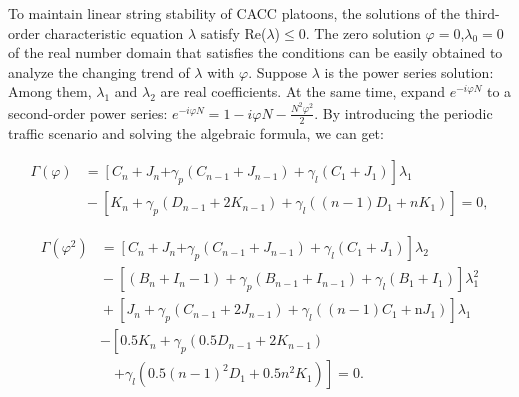 \documentclass[journal]{IEEEtran}
\begin{document}
To maintain linear string stability of CACC platoons, the solutions of the third-order characteristic equation $\lambda$ satisfy Re($\lambda$)$\leq$0. The zero solution $\varphi=0$,$\lambda_0=0$ of the real number domain that satisfies the conditions can be easily obtained to analyze the changing trend of $\lambda$ with $\varphi$. Suppose $\lambda$ is the power series solution: Among them, $\lambda_1$ and $\lambda_2$ are real coefficients. At the same time, expand $e^{-i \varphi N}$ to a second-order power series: $e^{-i \varphi N}=1-i \varphi N-\frac{N^{2} \varphi^{2}}{2}$. By introducing the periodic traffic scenario and solving the algebraic formula, we can get:
\begin{small}
  \begin{equation}
    \begin{aligned}
      \Gamma(\varphi) & =\left[C_{n}+J_{n}\right.\left.+\gamma_{p}\left(C_{n-1}+J_{n-1}\right)+\gamma_{l}\left(C_{1}+J_{1}\right)\right] \lambda_{1}       \\
                      & \!-\!\left[K_{n}\!+\!\gamma_{p}\left(D_{n-1}\!+\!2 K_{n-1}\right)\!+\!\gamma_{l}\left((n-1) D_{1}\!+\!n K_{1}\right)\right]\!=\!0,
    \end{aligned}
    \label{Eq15}
  \end{equation}
\end{small}
\begin{small}
  \begin{equation}
    \begin{aligned}
      \Gamma\left(\varphi^{2}\right) & =\left[C_{n}+J_{n}\right.\left.+\gamma_{p}\left(C_{n-1}+J_{n-1}\right)+\gamma_{l}\left(C_{1}+J_{1}\right)\right] \lambda_{2}                               \\
                                     & \!-\!\left[\left(B_{n}\!+\!I_{n}-1\right)\!+\!\gamma_{p}\left(B_{n-1}\!+\!I_{n-1}\right)\!+\!\gamma_{l}\left(B_{1}\!+\!I_{1}\right)\right] \lambda_{1}^{2} \\
                                     & \!+\!\left[J_{n}\!+\!\gamma_{p}\left(C_{n-1}\!+\!2 J_{n-1}\right)\!+\!\gamma_{l}\left((n-1) C_{1}\!+\!\mathrm{n} J_{1}\right)\right] \lambda_{1}           \\
                                     & -\left[0.5 K_{n}+\gamma_{p}\left(0.5 D_{n-1}+2 K_{n-1}\right)\right.                                                                                       \\
                                     & \quad\left.+\gamma_{l}\left(0.5(n-1)^{2} D_{1}+0.5 n^{2} K_{1}\right)\right]=0.
    \end{aligned}
    \label{Eq16}
  \end{equation}
\end{small}
\end{document}
